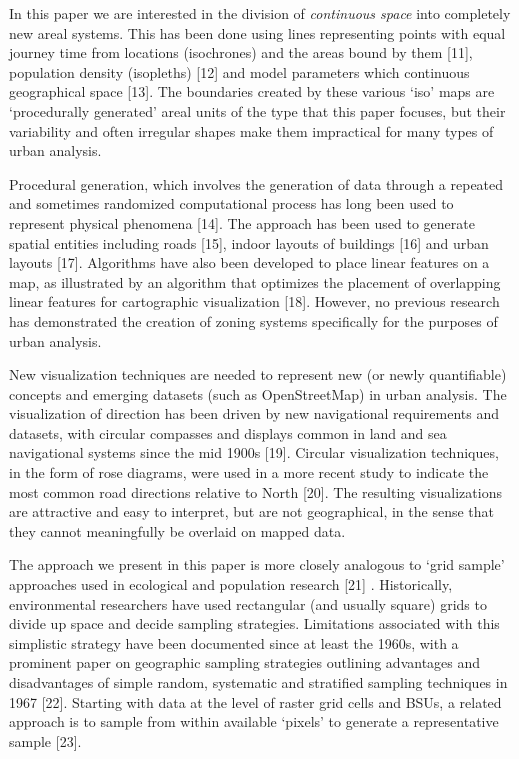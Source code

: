 \documentclass{josis}
\begin{document}
In this paper we are interested in the division of \emph{continuous space} into completely new areal systems.
This has been done using lines representing points with equal journey time from locations (isochrones) and the areas bound by them {[}11{]}, population density (isopleths) {[}12{]} and model parameters which continuous geographical space {[}13{]}.
The boundaries created by these various `iso' maps are `procedurally generated' areal units of the type that this paper focuses, but their variability and often irregular shapes make them impractical for many types of urban analysis.

Procedural generation, which involves the generation of data through a repeated and sometimes randomized computational process has long been used to represent physical phenomena {[}14{]}. The approach has been used to generate spatial entities including roads {[}15{]}, indoor layouts of buildings {[}16{]} and urban layouts {[}17{]}. Algorithms have also been developed to place linear features on a map, as illustrated by an algorithm that optimizes the placement of overlapping linear features for cartographic visualization {[}18{]}.
However, no previous research has demonstrated the creation of zoning systems specifically for the purposes of urban analysis.

New visualization techniques are needed to represent new (or newly quantifiable) concepts and emerging datasets (such as OpenStreetMap) in urban analysis.
The visualization of direction has been driven by new navigational requirements and datasets, with circular compasses and displays common in land and sea navigational systems since the mid 1900s {[}19{]}. Circular visualization techniques, in the form of rose diagrams, were used in a more recent study to indicate the most common road directions relative to North {[}20{]}. The resulting visualizations are attractive and easy to interpret, but are not geographical, in the sense that they cannot meaningfully be overlaid on mapped data.

The approach we present in this paper is more closely analogous to `grid sample' approaches used in ecological and population research {[}21{]} . Historically, environmental researchers have used rectangular (and usually square) grids to divide up space and decide sampling strategies. Limitations associated with this simplistic strategy have been documented since at least the 1960s, with a prominent paper on geographic sampling strategies outlining advantages and disadvantages of simple random, systematic and stratified sampling techniques in 1967 {[}22{]}. Starting with data at the level of raster grid cells and BSUs, a related approach is to sample from within available `pixels' to generate a representative sample {[}23{]}.
\end{document}
